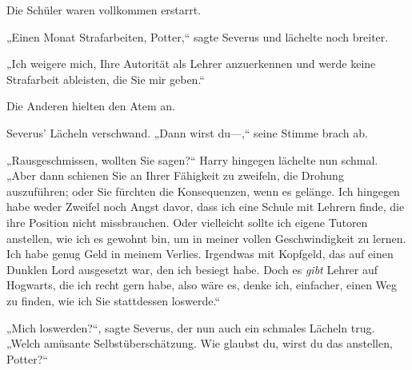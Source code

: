 Die Schüler waren vollkommen erstarrt.

„Einen Monat Strafarbeiten, Potter,“ sagte Severus und lächelte noch breiter.

„Ich weigere mich, Ihre Autorität als Lehrer anzuerkennen und werde keine Strafarbeit ableisten, die Sie mir geben.“

Die Anderen hielten den Atem an.

Severus’ Lächeln verschwand. „Dann wirst du—,“ seine Stimme brach ab.

„Rausgeschmissen, wollten Sie sagen?“ Harry hingegen lächelte nun schmal. „Aber dann schienen Sie an Ihrer Fähigkeit zu zweifeln, die Drohung auszuführen; oder Sie fürchten die Konsequenzen, wenn es gelänge. Ich hingegen habe weder Zweifel noch Angst davor, dass ich eine Schule mit Lehrern finde, die ihre Position nicht missbrauchen. Oder vielleicht sollte ich eigene Tutoren anstellen, wie ich es gewohnt bin, um in meiner vollen Geschwindigkeit zu lernen. Ich habe genug Geld in meinem Verlies. Irgendwas mit Kopfgeld, das auf einen Dunklen Lord ausgesetzt war, den ich besiegt habe. Doch es \emph{gibt} Lehrer auf Hogwarts, die ich recht gern habe, also wäre es, denke ich, einfacher, einen Weg zu finden, wie ich Sie stattdessen loswerde.“

„Mich loswerden?“, sagte Severus, der nun auch ein schmales Lächeln trug. „Welch amüsante Selbstüberschätzung. Wie glaubst du, wirst du das anstellen, Potter?“

